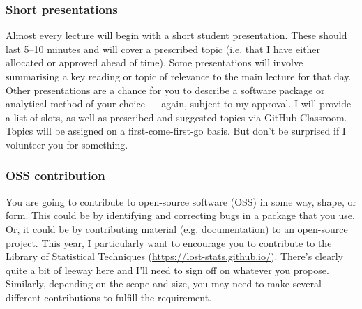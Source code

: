 \documentclass[12]{article}
\begin{document}
\vspace{-0.25cm}
\subsubsection*{Short presentations}

Almost every lecture will begin with a short student presentation. These should last 5--10 minutes and will cover a prescribed topic (i.e. that I have either allocated or approved ahead of time). Some presentations will involve summarising a key reading or topic of relevance to the main lecture for that day. Other presentations are a chance for you to describe a software package or analytical method of your choice --- again, subject to my approval. I will provide a list of slots, as well as prescribed and suggested topics via GitHub Classroom. Topics will be assigned on a first-come-first-go basis. But don't be surprised if I volunteer you for something.


\vspace{-0.25cm}
\subsubsection*{OSS contribution}

You are going to contribute to open-source software (OSS) in some way, shape, or form. This could be by identifying and correcting bugs in a package that you use. Or, it could be by contributing material (e.g. documentation) to an open-source project. This year, I particularly want to encourage you to contribute to the Library of Statistical Techniques (\url{https://lost-stats.github.io/}). There's clearly quite a bit of leeway here and I'll need to sign off on whatever you propose. Similarly, depending on the scope and size, you may need to make several different contributions to fulfill the requirement.
\end{document}
